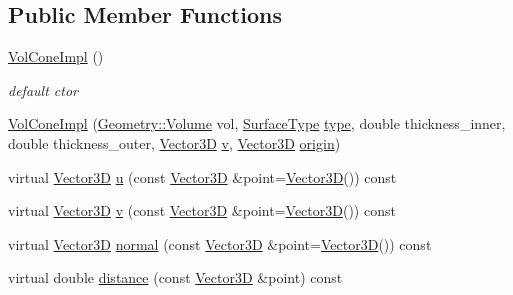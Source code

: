 \subsection*{Public Member Functions}
\begin{DoxyCompactItemize}
\item 
\hyperlink{class_d_d4hep_1_1_d_d_rec_1_1_vol_cone_impl_a53aac2e0c112ae12be098853a5b93d64}{Vol\+Cone\+Impl} ()
\begin{DoxyCompactList}\small\item\em default c\textquotesingle{}tor \end{DoxyCompactList}\item 
\hyperlink{class_d_d4hep_1_1_d_d_rec_1_1_vol_cone_impl_acdcb9ac446fc79054df650fa90a0d381}{Vol\+Cone\+Impl} (\hyperlink{class_d_d4hep_1_1_geometry_1_1_volume}{Geometry\+::\+Volume} vol, \hyperlink{class_d_d_surfaces_1_1_surface_type}{Surface\+Type} \hyperlink{class_d_d4hep_1_1_d_d_rec_1_1_vol_surface_base_aa59d5b3c519424448db12c015a95b760}{type}, double thickness\+\_\+inner, double thickness\+\_\+outer, \hyperlink{class_d_d_surfaces_1_1_vector3_d}{Vector3D} \hyperlink{class_d_d4hep_1_1_d_d_rec_1_1_vol_cone_impl_a87e96fba8185dccf1422d60a748f5d2f}{v}, \hyperlink{class_d_d_surfaces_1_1_vector3_d}{Vector3D} \hyperlink{class_d_d4hep_1_1_d_d_rec_1_1_vol_surface_base_a057675c3f4a66116703a467df8c348fe}{origin})
\item 
virtual \hyperlink{class_d_d_surfaces_1_1_vector3_d}{Vector3D} \hyperlink{class_d_d4hep_1_1_d_d_rec_1_1_vol_cone_impl_a6e9da4a465f95d8579fb579a7ef1236c}{u} (const \hyperlink{class_d_d_surfaces_1_1_vector3_d}{Vector3D} \&point=\hyperlink{class_d_d_surfaces_1_1_vector3_d}{Vector3D}()) const
\item 
virtual \hyperlink{class_d_d_surfaces_1_1_vector3_d}{Vector3D} \hyperlink{class_d_d4hep_1_1_d_d_rec_1_1_vol_cone_impl_a87e96fba8185dccf1422d60a748f5d2f}{v} (const \hyperlink{class_d_d_surfaces_1_1_vector3_d}{Vector3D} \&point=\hyperlink{class_d_d_surfaces_1_1_vector3_d}{Vector3D}()) const
\item 
virtual \hyperlink{class_d_d_surfaces_1_1_vector3_d}{Vector3D} \hyperlink{class_d_d4hep_1_1_d_d_rec_1_1_vol_cone_impl_a0bdca94e1f57432f8b3d20c4cb1a3f7e}{normal} (const \hyperlink{class_d_d_surfaces_1_1_vector3_d}{Vector3D} \&point=\hyperlink{class_d_d_surfaces_1_1_vector3_d}{Vector3D}()) const
\item 
virtual double \hyperlink{class_d_d4hep_1_1_d_d_rec_1_1_vol_cone_impl_af24505f927a05c9d8225609135257f1c}{distance} (const \hyperlink{class_d_d_surfaces_1_1_vector3_d}{Vector3D} \&point) const

\end{DoxyCompactItemize}
